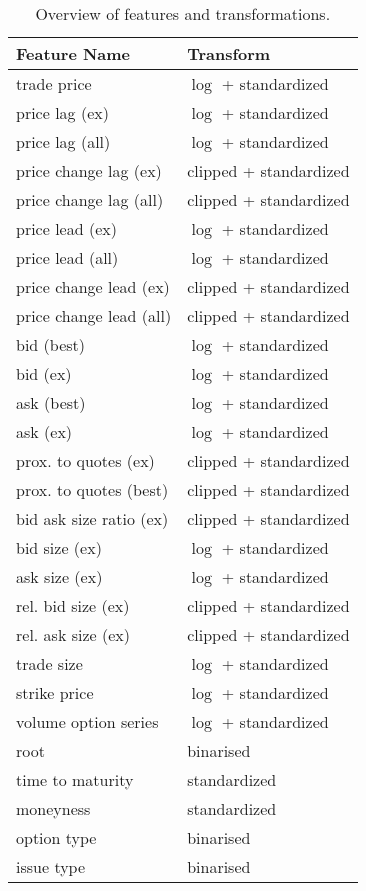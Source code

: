 \begin{table}[H]
    \centering
    \begin{tabular}{@{}ll@{}}
        \toprule
        Feature Name            & Transform              \\ \midrule
        trade price             & $\log$ + standardized  \\
        price lag (ex)          & $\log$ + standardized  \\
        price lag (all)         & $\log$ + standardized  \\
        price change lag (ex)   & clipped + standardized \\
        price change lag (all)  & clipped + standardized \\
        price lead (ex)         & $\log$ + standardized  \\
        price lead (all)        & $\log$ + standardized  \\
        price change lead (ex)  & clipped + standardized \\
        price change lead (all) & clipped + standardized \\
        bid (best)              & $\log$ + standardized  \\
        bid (ex)                & $\log$ + standardized  \\
        ask (best)              & $\log$ + standardized  \\
        ask (ex)                & $\log$ + standardized  \\
        prox. to quotes (ex)    & clipped + standardized \\
        prox. to quotes (best)  & clipped + standardized \\
        bid ask size ratio (ex) & clipped + standardized \\
        bid size (ex)           & $\log$ + standardized  \\
        ask size (ex)           & $\log$ + standardized  \\
        rel. bid size (ex)      & clipped + standardized \\
        rel. ask size (ex)      & clipped + standardized \\
        trade size              & $\log$ + standardized  \\
        strike price            & $\log$ + standardized  \\
        volume option series    & $\log$ + standardized  \\
        root                    & binarised              \\
        time to maturity        & standardized           \\
        moneyness               & standardized           \\
        option type             & binarised              \\
        issue type              & binarised              \\ \bottomrule
    \end{tabular}
    \caption[Overview of Features and Transformations]{Overview of features and transformations.}
    \label{tab:features-transformations}
\end{table}

